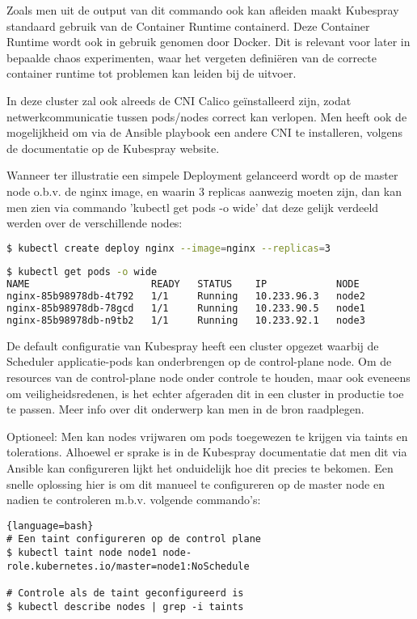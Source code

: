 Zoals men uit de output van dit commando ook kan afleiden maakt Kubespray standaard gebruik van de Container Runtime containerd. Deze Container Runtime wordt ook in gebruik genomen door Docker. Dit is relevant voor later in bepaalde chaos experimenten, waar het vergeten definiëren van de correcte container runtime tot problemen kan leiden bij de uitvoer. 

In deze cluster zal ook alreeds de CNI Calico geïnstalleerd zijn, zodat netwerkcommunicatie tussen pods/nodes correct kan verlopen. Men heeft ook de mogelijkheid om via de Ansible playbook een andere CNI te installeren, volgens de documentatie op de Kubespray website. 

Wanneer ter illustratie een simpele Deployment gelanceerd wordt op de master node o.b.v. de nginx image, en waarin 3 replicas aanwezig moeten zijn, dan kan men zien via commando 'kubectl get pods -o wide' dat deze gelijk verdeeld werden over de verschillende nodes:

\begin{lstlisting}[language=bash]
$ kubectl create deploy nginx --image=nginx --replicas=3
        
$ kubectl get pods -o wide
NAME                     READY   STATUS    IP            NODE
nginx-85b98978db-4t792   1/1     Running   10.233.96.3   node2
nginx-85b98978db-78gcd   1/1     Running   10.233.90.5   node1
nginx-85b98978db-n9tb2   1/1     Running   10.233.92.1   node3

\end{lstlisting}

De default configuratie van Kubespray heeft een cluster opgezet waarbij de Scheduler applicatie-pods kan onderbrengen op de control-plane node. Om de resources van de control-plane node onder controle te houden, maar ook eveneens om veiligheidsredenen, is het echter afgeraden dit in een cluster in productie toe te passen. Meer info over dit onderwerp kan men in de bron raadplegen. \autocite{Bailey2016}

Optioneel: Men kan nodes vrijwaren om pods toegewezen te krijgen via taints en tolerations. Alhoewel er sprake is in de Kubespray documentatie dat men dit via Ansible kan configureren lijkt het onduidelijk hoe dit precies te bekomen. \autocite{Kubespray2022b}
Een snelle oplossing hier is om dit manueel te configureren op de master node en nadien te controleren m.b.v. volgende commando's: 
\begin{lstlisting}{language=bash}
# Een taint configureren op de control plane
$ kubectl taint node node1 node-role.kubernetes.io/master=node1:NoSchedule

# Controle als de taint geconfigureerd is
$ kubectl describe nodes | grep -i taints

\end{lstlisting}

